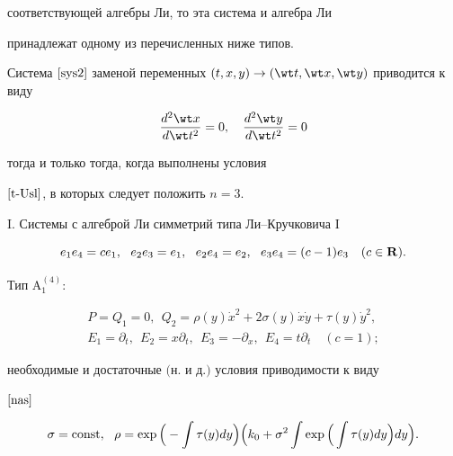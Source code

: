\begin{thms}
соответствующей алгебры Ли, то эта система и алгебра Ли


принадлежат одному из перечисленных ниже типов. 


Система $\eqref{sys2}$ заменой переменных $(t,x,y)\to (\wt t,


\wt x, \wt y)$ приводится к виду


\begin{equation}\label{nas}


\frac{d^2\wt x}{d\wt t^2}=0,\quad \frac{d^2\wt y}{d\wt t^2}=0


\end{equation}


тогда и только тогда, когда выполнены условия


$\eqref{t-Usl}$, в которых следует положить $n=3$.








$\mathrm I$. Системы с алгеброй Ли симметрий типа Ли--Кручковича $\mathrm I$


$$


e_1e_4=ce_1,\ \ e_2e_3=e_1,\ \


e_2e_4=e_2,\ \ e_3e_4=(c-1)e_3 \quad (c\in\bold R).


$$





Тип $\mathrm{A^{(4)}_1}{:}$


\begin{gather*}


P= Q_1=0,\ \ Q_2=\rho(y)\Dot x^2+2\sigma (y)\Dot x\Dot y + \tau(y)\Dot y^2, \\


E_1=\partial_t,\ \ E_2=x\partial_ t,\ \


E_3=-\partial_ x,\ \


E_4=t\partial_t\quad (c=1);


\end{gather*}


необходимые и достаточные $($н. и д.$)$ условия приводимости к виду


$\eqref{nas}$ 


$$


\sigma=\const,\ \ { \rho}= \exp\Big(-\int 


\tau ({ y})d{ y}\Big)\Big({k_0}+ \sigma^2


\int\exp\Big(\int \tau ( y)d y\Big)d{ y} \Big).


$$






\end{thms}
